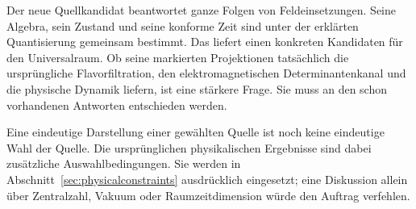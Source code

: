 
Der neue Quellkandidat beantwortet ganze Folgen von Feldeinsetzungen. Seine Algebra, sein Zustand und seine konforme Zeit sind unter der erklärten Quantisierung gemeinsam bestimmt. Das liefert einen konkreten Kandidaten für den Universalraum. Ob seine markierten Projektionen tatsächlich die ursprüngliche Flavorfiltration, den elektromagnetischen Determinantenkanal und die physische Dynamik liefern, ist eine stärkere Frage. Sie muss an den schon vorhandenen Antworten entschieden werden.

Eine eindeutige Darstellung einer gewählten Quelle ist noch keine eindeutige Wahl der Quelle. Die ursprünglichen physikalischen Ergebnisse sind dabei zusätzliche Auswahlbedingungen. Sie werden in Abschnitt~\ref{sec:physicalconstraints} ausdrücklich eingesetzt; eine Diskussion allein über Zentralzahl, Vakuum oder Raumzeitdimension würde den Auftrag verfehlen.

